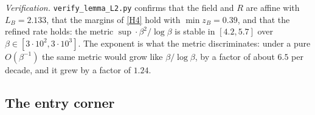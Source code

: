 \documentclass[11pt]{article}
\theoremstyle{definition}
\theoremstyle{remark}
\begin{document}
\noindent\emph{Verification.} \texttt{verify\_lemma\_L2.py} confirms that the
field and $R$ are affine with $L_B=2.133$, that the margins of \eqref{H4} hold
with $\min z_B=0.39$, and that the refined rate holds: the metric
$\sup\cdot\beta^{2}/\log\beta$ is stable in $[4.2,5.7]$ over
$\beta\in[3\cdot10^2,3\cdot10^3]$. The exponent is what the metric discriminates:
under a pure $O(\beta^{-1})$ the same metric would grow like $\beta/\log\beta$,
by a factor of about $6.5$ per decade, and it grew by a factor of $1.24$.


\subsection{The entry corner}\label{app:L3}
\end{document}
